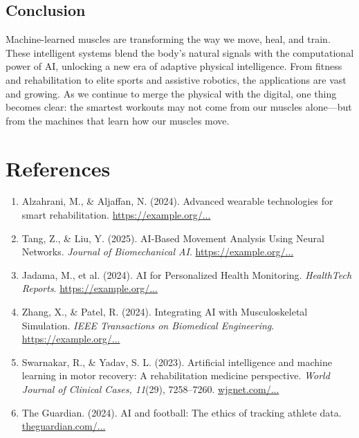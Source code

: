 \documentclass[a4paper,10pt,twocolumn]{memoir}
\begin{document}
\subsection*{Conclusion}

Machine-learned muscles are transforming the way we move, heal, and train. These intelligent systems blend the body's natural signals with the computational power of AI, unlocking a new era of adaptive physical intelligence. From fitness and rehabilitation to elite sports and assistive robotics, the applications are vast and growing. As we continue to merge the physical with the digital, one thing becomes clear: the smartest workouts may not come from our muscles alone—but from the machines that learn how our muscles move.

\section*{References}

\begin{enumerate}
    \item Alzahrani, M., & Aljaffan, N. (2024). Advanced wearable technologies for smart rehabilitation. \href{https://example.org/alzahrani2024}{https://example.org/...}
    
    \item Tang, Z., & Liu, Y. (2025). AI-Based Movement Analysis Using Neural Networks. \textit{Journal of Biomechanical AI}. \href{https://example.org/tang2025ai}{https://example.org/...}

    \item Jadama, M., et al. (2024). AI for Personalized Health Monitoring. \textit{HealthTech Reports}. \href{https://example.org/jadama2024ai}{https://example.org/...}
    
    \item Zhang, X., & Patel, R. (2024). Integrating AI with Musculoskeletal Simulation. \textit{IEEE Transactions on Biomedical Engineering}. \href{https://example.org/zhang2024integrating}{https://example.org/...}
    
    \item Swarnakar, R., & Yadav, S. L. (2023). Artificial intelligence and machine learning in motor recovery: A rehabilitation medicine perspective. \textit{World Journal of Clinical Cases, 11}(29), 7258–7260. \href{https://www.wjgnet.com/2307-8960/full/v11/i29/7258.htm}{wjgnet.com/...}
    
    \item The Guardian. (2024). AI and football: The ethics of tracking athlete data. \href{https://www.theguardian.com/football/2024/jan/12/ai-ethics-sports-data}{theguardian.com/...}
\end{enumerate}
\end{document}

